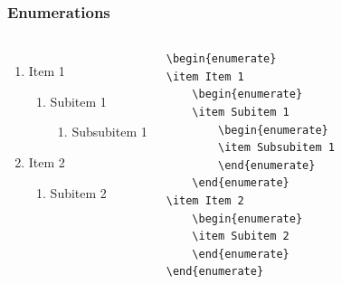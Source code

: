 \documentclass[utf8,aspectratio=169,ngerman,english]{beamer}
\begin{document}
\begin{frame}[containsverbatim]
\frametitle{Enumerations}

\begin{columns}[onlytextwidth,T]

\begin{enumerate}
\item Item 1
    \begin{enumerate}
    \item Subitem 1
        \begin{enumerate}
        \item Subsubitem 1
        \end{enumerate}
    \end{enumerate}
\item Item 2
    \begin{enumerate}
    \item Subitem 2
    \end{enumerate}
\end{enumerate}

\begin{lstlisting}[language={[LaTeX]TeX},numbers=none]
\begin{enumerate}
\item Item 1
    \begin{enumerate}
    \item Subitem 1
        \begin{enumerate}
        \item Subsubitem 1
        \end{enumerate}
    \end{enumerate}
\item Item 2
    \begin{enumerate}
    \item Subitem 2
    \end{enumerate}
\end{enumerate} 
\end{lstlisting}

\end{columns}
\end{frame}
\end{document}

